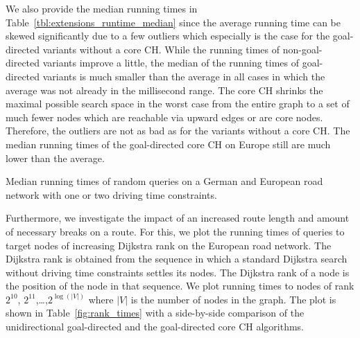 We also provide the median running times in Table~\ref{tbl:extensions_runtime_median} since the average running time can be skewed significantly due to a few outliers which especially is the case for the goal-directed variants without a core CH. While the running times of non-goal-directed variants improve a little, the median of the running times of goal-directed variants is much smaller than the average in all cases in which the average was not already in the millisecond range. The core CH shrinks the maximal possible search space in the worst case from the entire graph to a set of much fewer nodes which are reachable via upward edges or are core nodes. Therefore, the outliers are not as bad as for the variants without a core CH. The median running times of the goal-directed core CH on Europe still are much lower than the average.

\begin{table}[hbtp]
	\centering
	
	\caption{Median running times of random queries on a German and European road network with one or two driving time constraints.}
	\label{tbl:extensions_runtime_median}
\end{table}

Furthermore, we investigate the impact of an increased route length and amount of necessary breaks on a route. For this, we plot the running times of queries to target nodes of increasing Dijkstra rank on the European road network. The Dijkstra rank is obtained from the sequence in which a standard Dijkstra search without driving time constraints settles its nodes. The Dijkstra rank of a node is the position of the node in that sequence. We plot running times to nodes of rank $2^{10}$, $2^{11}$,\dots,$2^{\log(|V|)}$ where $|V|$ is the number of nodes in the graph. The plot is shown in Table~\ref{fig:rank_times} with a side-by-side comparison of the unidirectional goal-directed and the goal-directed core CH algorithms.

